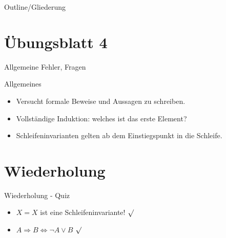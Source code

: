 
\subtitle{Foliensatz 5}
\date{22. November 2012}



\begin{frame}
    \titlepage
\end{frame}

\begin{frame}{Outline/Gliederung}
    \tableofcontents
\end{frame}

\section{Übungsblatt 4}
\begin{frame}{Allgemeine Fehler, Fragen}
    \begin{block}{Allgemeines}
        \begin{itemize}
            \item Versucht formale Beweise und Aussagen zu schreiben.
            \item Vollständige Induktion: welches ist das erste Element?
            \item Schleifeninvarianten gelten ab dem Einstiegspunkt in die Schleife.
        \end{itemize}
    \end{block}
\end{frame}

\section{Wiederholung} 
\begin{frame} {Wiederholung - Quiz}
    \begin{itemize}
        \item $X=X$ ist eine Schleifeninvariante! 
             {\color{darkgreen}$\surd$}\\
            \color{black}
        \item $A \Rightarrow B \Leftrightarrow \neg A \lor B$
             {\color{darkgreen}$\surd$}\\
            \color{black}
    \end{itemize}
\end{frame}

